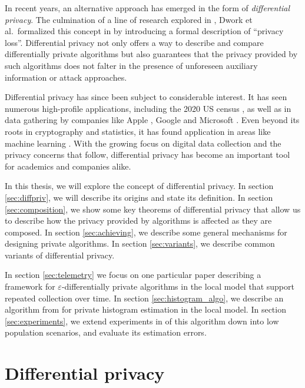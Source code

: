 \documentclass[a4paper,12pt]{article}
\renewcommand{\epsilon}{\varepsilon}
\begin{document}
In recent years, an alternative approach has emerged in the form of \emph{differential privacy}. The culmination of a line of research explored in \cite{precursor_2003,precursor_2004,precusor_2005}, Dwork et al.\ formalized this concept in \cite{dworketal2006} by introducing a formal description of ``privacy loss''. Differential privacy not only offers a way to describe and compare differentially private algorithms but also guarantees that the privacy provided by such algorithms does not falter in the presence of unforeseen auxiliary information or attack approaches.

Differential privacy has since been subject to considerable interest. It has seen numerous high-profile applications, including the 2020 US census \cite{us_census}, as well as in data gathering by companies like Apple \cite{apple_differential,apple_differential_loss}, Google \cite{google_rappor,google_prochlo} and Microsoft \cite{dworketal2006,microsoft_telemetry}. Even beyond its roots in cryptography and statistics, it has found application in areas like machine learning \cite{ml_abadi,ml_shokri,ml_papernot}. With the growing focus on digital data collection and the privacy concerns that follow, differential privacy has become an important tool for academics and companies alike.

In this thesis, we will explore the concept of differential privacy. In section \ref{sec:diffpriv}, we will describe its origins and state its definition. In section \ref{sec:composition}, we show some key theorems of differential privacy that allow us to describe how the privacy provided by algorithms is affected as they are composed. In section \ref{sec:achieving}, we describe some general mechanisms for designing private algorithms. In section \ref{sec:variants}, we describe common variants of differential privacy.

In section \ref{sec:telemetry} we focus on one particular paper \cite{microsoft_telemetry} describing a framework for $\epsilon$-differentially private algorithms in the local model that support repeated collection over time. In section \ref{sec:histogram_algo}, we describe an algorithm from \cite{microsoft_telemetry} for private histogram estimation in the local model. In section \ref{sec:experiments}, we extend experiments in \cite{microsoft_telemetry} of this algorithm down into low population scenarios, and evaluate its estimation errors.

\newpage
\section{Differential privacy \label{sec:diffpriv}}
\end{document}
